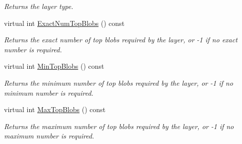 \begin{DoxyCompactItemize}
\begin{DoxyCompactList}\small\item\em Returns the layer type. \end{DoxyCompactList}\item 
virtual int \hyperlink{classcaffe_1_1SoftmaxWithLossLayer_a8222589f986db56372bf00935bae6180}{Exact\+Num\+Top\+Blobs} () const 
\begin{DoxyCompactList}\small\item\em Returns the exact number of top blobs required by the layer, or -\/1 if no exact number is required. \end{DoxyCompactList}\item 
virtual int \hyperlink{classcaffe_1_1SoftmaxWithLossLayer_a8994c9ed80aa3dac79a81aefe8f5ee64}{Min\+Top\+Blobs} () const 
\begin{DoxyCompactList}\small\item\em Returns the minimum number of top blobs required by the layer, or -\/1 if no minimum number is required. \end{DoxyCompactList}\item 
virtual int \hyperlink{classcaffe_1_1SoftmaxWithLossLayer_ac1f31629bf294a9281c5600f7e890232}{Max\+Top\+Blobs} () const 
\begin{DoxyCompactList}\small\item\em Returns the maximum number of top blobs required by the layer, or -\/1 if no maximum number is required. \end{DoxyCompactList}\end{DoxyCompactItemize}
